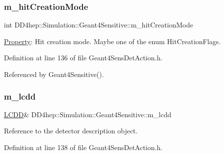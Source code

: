 \subsubsection{\texorpdfstring{m\+\_\+hit\+Creation\+Mode}{m\_hitCreationMode}}
{\footnotesize\ttfamily int D\+D4hep\+::\+Simulation\+::\+Geant4\+Sensitive\+::m\+\_\+hit\+Creation\+Mode\hspace{0.3cm}{\ttfamily [protected]}}



\hyperlink{class_d_d4hep_1_1_property}{Property}\+: Hit creation mode. Maybe one of the enum Hit\+Creation\+Flags. 



Definition at line 136 of file Geant4\+Sens\+Det\+Action.\+h.



Referenced by Geant4\+Sensitive().

\hypertarget{class_d_d4hep_1_1_simulation_1_1_geant4_sensitive_af7bcfc4733d5822cb9d4b0852b121800}{}\label{class_d_d4hep_1_1_simulation_1_1_geant4_sensitive_af7bcfc4733d5822cb9d4b0852b121800} 
\subsubsection{\texorpdfstring{m\+\_\+lcdd}{m\_lcdd}}
{\footnotesize\ttfamily \hyperlink{class_d_d4hep_1_1_simulation_1_1_geant4_sensitive_a3373caa6917867ca7c871df20fb467c8}{L\+C\+DD}\& D\+D4hep\+::\+Simulation\+::\+Geant4\+Sensitive\+::m\+\_\+lcdd\hspace{0.3cm}{\ttfamily [protected]}}



Reference to the detector description object. 



Definition at line 138 of file Geant4\+Sens\+Det\+Action.\+h.

\hypertarget{class_d_d4hep_1_1_simulation_1_1_geant4_sensitive_a14b5d00feae681d434df04c0d9fc8f70}{}\label{class_d_d4hep_1_1_simulation_1_1_geant4_sensitive_a14b5d00feae681d434df04c0d9fc8f70} 
